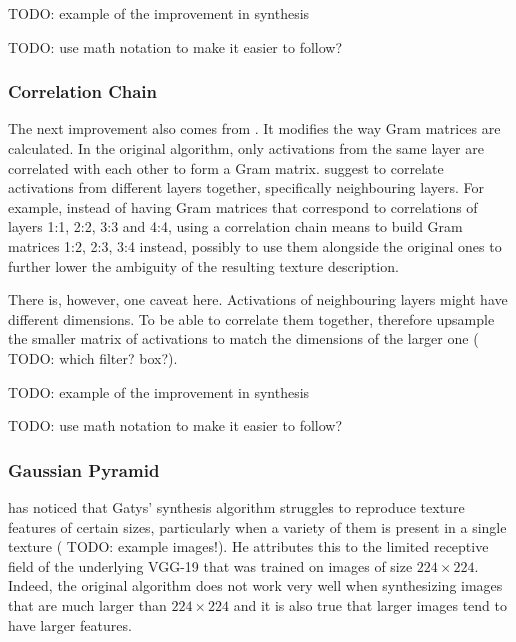 {\color{red} TODO: example of the improvement in synthesis}

{\color{red} TODO: use math notation to make it easier to follow?}

\subsubsection{Correlation Chain}
\label{section:methods-texture_model-improvements-correlation_chain}

The next improvement also comes from \citet{Novak2016}. It modifies the way Gram matrices are calculated. In the original algorithm, only activations from the same layer are correlated with each other to form a Gram matrix. \citet{Novak2016} suggest to correlate activations from different layers together, specifically neighbouring layers. For example, instead of having Gram matrices that correspond to correlations of layers 1:1, 2:2, 3:3 and 4:4, using a correlation chain means to build Gram matrices 1:2, 2:3, 3:4 instead, possibly to use them alongside the original ones to further lower the ambiguity of the resulting texture description.

There is, however, one caveat here. Activations of neighbouring layers might have different dimensions. To be able to correlate them together, \citet{Novak2016} therefore upsample the smaller matrix of activations to match the dimensions of the larger one ({\color{red} TODO: which filter? box?}).

{\color{red} TODO: example of the improvement in synthesis}

{\color{red} TODO: use math notation to make it easier to follow?}

\subsubsection{Gaussian Pyramid}
\label{section:methods-texture_model-improvements-gaussian_pyramid}

\citet{Snelgrove2017} has noticed that Gatys' synthesis algorithm struggles to reproduce texture features of certain sizes, particularly when a variety of them is present in a single texture ({\color{red} TODO: example images!}). He attributes this to the limited receptive field of the underlying VGG-19 that was trained on images of size \(224 \times 224\). Indeed, the original algorithm does not work very well when synthesizing images that are much larger than \(224 \times 224\) and it is also true that larger images tend to have larger features.

